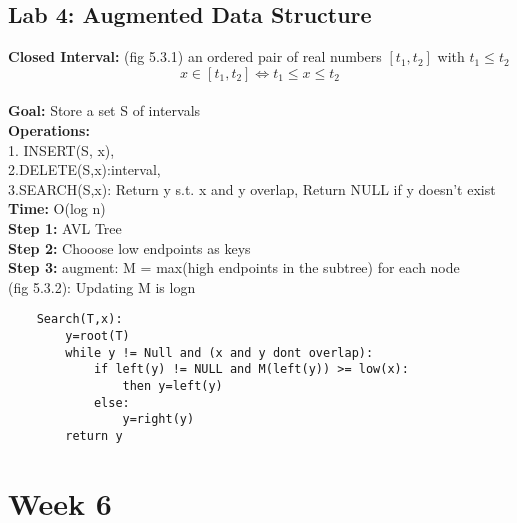 \documentclass{article}
\begin{document}
	\subsection{Lab 4: Augmented Data Structure\\}
	\textbf{Closed Interval:} (fig 5.3.1) an ordered pair of real numbers $[t_1, t_2]$ with $t_1\le t_2$ $$x\in [t_1, t_2]\iff t_1\le x\le t_2$$\\
	\textbf{Goal:} Store a set S of intervals\\
	\textbf{Operations:} \\1. INSERT(S, x),\\ 2.DELETE(S,x):interval, \\3.SEARCH(S,x): Return y s.t. x and y overlap, Return NULL if y doesn't exist\\
	\textbf{Time:} O(log n)\\
	\textbf{Step 1:} AVL Tree\\
	\textbf{Step 2:} Chooose low endpoints as keys\\
	\textbf{Step 3:} augment: M = max(high endpoints in the subtree) for each node\\
	(fig 5.3.2): Updating M is logn\\
	\begin{lstlisting}
	Search(T,x):
		y=root(T)
		while y != Null and (x and y dont overlap):
			if left(y) != NULL and M(left(y)) >= low(x):
				then y=left(y)
			else:
				y=right(y)
		return y
	\end{lstlisting}
	
	\section{Week 6}
\end{document}
